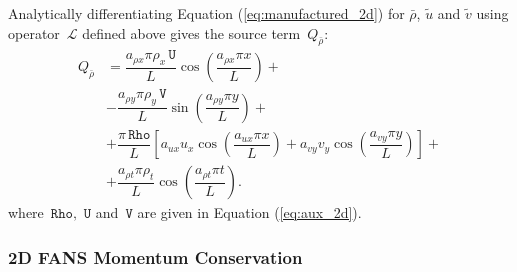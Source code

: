 \documentclass[10pt]{article}
\newcommand{\Rho}{\,\mathtt{Rho}}
\newcommand{\U}{\,\mathtt{U}}
\newcommand{\V}{\,\mathtt{V}}
\newcommand{\Lo}{\,\mathcal{L}}
\newcommand{\brho}{\bar{\rho}}
\newcommand{\tu}{\tilde{u}}
\newcommand{\tv}{\tilde{v}}
\begin{document}
Analytically differentiating Equation (\ref{eq:manufactured_2d}) for $\brho$, $\tu$ and $\tv$ using operator $\Lo$ defined above gives  the source term~$Q_{\brho}$:
\begin{equation}
 \begin{split}
Q_{\brho} &= \dfrac{a_{\rho x} \pi \rho_x \U }{L}\cos\left(\dfrac{a_{\rho x} \pi x}{L}\right)+\\
&-\dfrac{a_{\rho y} \pi \rho_y \V }{L}\sin\left(\dfrac{a_{\rho y} \pi y}{L}\right)+\\
&+\dfrac{\pi \Rho}{L}\left[a_{ux} u_x \cos\left(\dfrac{a_{ux} \pi x}{L}\right)+a_{vy} v_y \cos\left(\dfrac{a_{vy} \pi y}{L}\right)\right] +\\
&+\dfrac{a_{\rho t} \pi \rho_t }{L}\cos\left(\dfrac{a_{\rho t} \pi t}{L}\right).
 \end{split}
\end{equation}
where $\Rho,\,\U$ and $\V$ are given in Equation (\ref{eq:aux_2d}).

\subsubsection{2D FANS Momentum Conservation}
\end{document}
